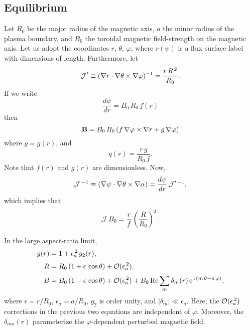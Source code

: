 \documentclass[12pt,prb,aps,notitlepage]{revtex4-1}
\begin{document}
\subsection{Equilibrium}
Let $R_0$ be the major radius of the magnetic axis, $a$ the minor radius of the plasma boundary, and  $B_0$ the toroidal magnetic field-strength on the magnetic axis. Let us adopt the 
coordinates $r$, $\theta$, $\varphi$, where $r(\psi)$ is a flux-surface label with dimensions of length. 
Furthermore, let
\begin{equation}
{\cal J}' \equiv (\nabla r\cdot\nabla\theta\times \nabla\varphi)^{-1}= \frac{r\,R^{\,2}}{R_0}.
\end{equation}
If we write
\begin{equation}\label{psidef}
\frac{d\psi}{dr}= B_0\,R_0\,f(r)
\end{equation}
then
\begin{equation}
{\bf B} = B_0\,R_0\,(f\,\nabla\varphi \times \nabla r + g\,\nabla\varphi)
\end{equation}
where $g=g(r)$, and 
\begin{equation}\label{qdef}
q(r) = \frac{r\,g}{R_0\,f}.
\end{equation}
Note that $f(r)$ and $g(r)$ are dimensionless. 
Now, 
\begin{equation}
{\cal J}^{\,-1} \equiv (\nabla\psi\cdot\nabla\theta\times \nabla\alpha) = \frac{d\psi}{dr}\,{\cal J}'^{\,-1},
\end{equation}
which implies that
\begin{equation}\label{jdef}
{\cal J}\,B_0 = \frac{r}{f}\left(\frac{R}{R_0}\right)^2.
\end{equation}

In the large aspect-ratio limit, 
\begin{align}
g(r)&=1+\epsilon_a^{\,2}\,g_2(r),\label{e151} \\[0.5ex]
R &= R_0\,(1+\epsilon\,\cos\theta) + {\cal O}(\epsilon_a^{\,2}),\label{rdef}\\[0.5ex]
B&= B_0\,(1-\epsilon\,\cos\theta)+{\cal O}(\epsilon_a^{\,2})+ B_0\,{\rm Re}\sum_{m} \delta_{m}(r)\,{\rm e}^{\,{\rm i}\,(m\,\theta-n\,\varphi)},\label{bdef1}
\end{align}
where $\epsilon=r/R_0$, $\epsilon_a=a/R_0$, $g_2$ is order unity, and $|\delta_{m}|\ll \epsilon_a$. Here, the ${\cal O}(\epsilon_a^{\,2})$ corrections in the previous two
equations are independent of $\varphi$. 
Moreover, the $\delta_{mn}(r)$ parameterize the $\varphi$-dependent perturbed magnetic field. 
\end{document}
